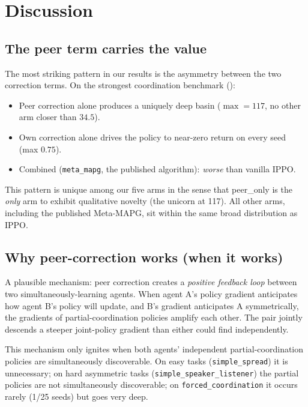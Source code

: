 \documentclass[11pt,a4paper]{article}
\newcommand{\arm}[1]{\texttt{#1}}
\begin{document}
\section{Discussion}\label{sec:discussion}

\subsection{The peer term carries the value}

The most striking pattern in our results is the asymmetry between the two correction terms.
On the strongest coordination benchmark ():

\begin{itemize}
    \item Peer correction alone produces a uniquely deep basin ($\max = 117$, no other arm closer than $34.5$).
    \item Own correction alone drives the policy to near-zero return on every seed (max $0.75$).
    \item Combined (\arm{meta\_mapg}, the published algorithm): \emph{worse} than vanilla IPPO.
\end{itemize}

This pattern is unique among our five arms in the sense that peer\_only is the \emph{only} arm to exhibit qualitative novelty (the unicorn at 117).
All other arms, including the published Meta-MAPG, sit within the same broad distribution as IPPO.

\subsection{Why peer-correction works (when it works)}

A plausible mechanism: peer correction creates a \emph{positive feedback loop} between two simultaneously-learning agents.
When agent A's policy gradient anticipates how agent B's policy will update, and B's gradient anticipates A symmetrically,
the gradients of partial-coordination policies amplify each other.
The pair jointly descends a steeper joint-policy gradient than either could find independently.

This mechanism only ignites when both agents' independent partial-coordination policies are simultaneously discoverable.
On easy tasks (\texttt{simple\_spread}) it is unnecessary; on hard asymmetric tasks (\texttt{simple\_speaker\_listener}) the partial policies are not simultaneously discoverable; on \texttt{forced\_coordination} it occurs rarely (1/25 seeds) but goes very deep.
\end{document}
